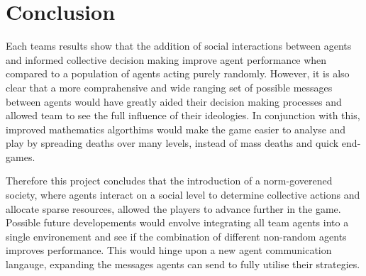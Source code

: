\chapter{Conclusion}\label{conclusion}

Each teams results show that the addition of social interactions between agents and informed collective decision making improve agent performance when compared to a population of agents acting purely randomly. However, it is also clear that a more comprahensive and wide ranging set of possible messages between agents would have greatly aided their decision making processes and allowed team to see the full influence of their ideologies. In conjunction with this, improved mathematics algorthims would make the game easier to analyse and play by spreading deaths over many levels, instead of mass deaths and quick end-games. 

Therefore this project concludes that the introduction of a norm-goverened society, where agents interact on a social level to determine collective actions and allocate sparse resources, allowed the players to advance further in the game. Possible future developements would envolve integrating all team agents into a single environement and see if the combination of different non-random agents improves performance. This would hinge upon a new agent communication langauge, expanding the messages agents can send to fully utilise their strategies.  


